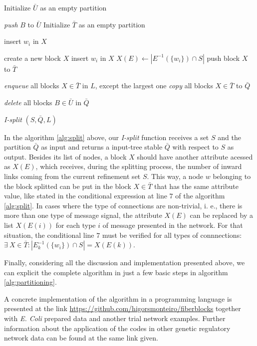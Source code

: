 \documentclass[12pt]{diazessay} %
\begin{document}
\begin{algorithm}[t]
	\SetAlgoLined
	Initialize $\bar{U}$ as an empty partition\;
	{
		{
			\textit{push} $B$ to $\bar{U}$\;
			Initialize $\bar{T}$ as an empty partition\;
			{
				{
					insert $w_i$ in $X$\;
					
				}
				{
					create a new block $X$\;
					insert $w_i$ in $X$\;
					$X(E) \leftarrow | E^{-1}(\{w_i\})\cap S |$\;
					push block $X$ to $\bar{T}$ 
				}
			}
		}
		\textit{enqueue} all blocks $X \in \bar{T}$ in $L$, except the largest one\;
		\textit{copy} all blocks $X \in \bar{T}$ to $\bar{Q}$\;
	}
	\textit{delete} all blocks $B \in \bar{U}$ in $\bar{Q}$
	\caption{\textit{I-split} $(S,\bar{Q}, L)$}
	\label{alg:split}
\end{algorithm}

In the algorithm \ref{alg:split} above, our \textit{I-split} function receives a set $S$ and the partition $\bar{Q}$ as input and returns a input-tree stable $\bar{Q}$ with respect to $S$ as output. Besides its list of nodes, a block $X$ should have another attribute acessed as $X(E)$, which receives, during the splitting process, the number of inward links coming from the current refinement set $S$. This way, a node $w$ belonging to the block splitted can be put in the block $X \in \bar{T}$ that has the same attribute value, like stated in the conditional expression at line $7$ of the algorithm \ref{alg:split}. In cases where the type of connections are non-trivial, i. e., there is more than one type of message signal, the attribute $X(E)$ can be replaced by a list $X(E(i))$ for each type $i$ of message presented in the network. For that situation, the conditional line $7$ must be verified for all types of connnections: $\exists \ X \in \bar{T} : | E_k^{-1}(\{w_i\})\cap S | = X(E(k))$.

Finally, considering all the discussion and implementation presented above, we can explicit the complete algorithm in just a few basic steps in algorithm \ref{alg:partitioning}.

A concrete implementation of the algorithm in a programming language is presented at the link \url{https://github.com/higorsmonteiro/fiberblocks} together with \textit{E. Coli} prepared data and another trial network examples. Further information about the application of the codes in other genetic regulatory network data can be found at the same link given.
\end{document}
